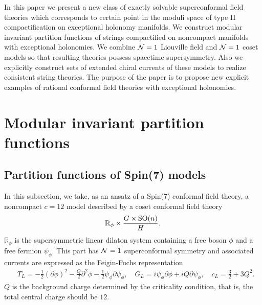 \documentclass[a4paper,12pt]{article}
\numberwithin{equation}{section}
\newcommand{\Rb}{\mathbb{R}}
\newcommand{\Ncal}{{\cal N}}
\newcommand{\del}{\partial}
\newcommand{\Spin}[1]{{\rm Spin}(#1)}
\newcommand{\SO}[1]{{\rm SO}(#1)}
\newcommand{\psil}{\psi_{\phi}}
\begin{document}
In this paper we present a new class of exactly solvable superconformal 
field theories which corresponds to certain point in the moduli space of 
type II compactification on exceptional holonomy manifolds. We construct 
modular invariant partition functions of strings compactified on 
noncompact manifolds with exceptional holonomies. We combine $\Ncal=1$ 
Liouville field and $\Ncal=1$ coset models so that resulting theories 
possess spacetime supersymmetry. Also 
we explicitly construct sets of extended chiral currents of these models 
to realize consistent string theories. The purpose of the paper is to 
propose new explicit examples of rational conformal field theories with 
exceptional holonomies.

\section{Modular invariant partition functions}
\subsection{Partition functions of \Spin7 models}
\label{spin7CFT}
In this subsection, we take, as an ansatz of a \Spin 7 conformal field
theory, a noncompact $c=12$ model described by a coset conformal field
theory
\begin{align}
 \Rb_{\phi}\times \frac{G\times \SO n}{H}.\label{G2internal}
\end{align}
$\Rb_{\phi}$ is the supersymmetric linear dilaton system
containing a free boson $\phi$ and a free fermion $\psil$. 
This part has $\Ncal=1$ superconformal symmetry and associated
 currents are expressed as the  Feigin-Fuchs representation
\begin{align}
 &T_{L}=-\frac12 (\del \phi)^2-\frac{Q}{2}\del^2\phi-\frac12 \psil\del\psil,
 \quad G_{L}=i\psil\del\phi+iQ\del\psil, \quad c_{L}=\frac32 + 3Q^2.
\label{2-2}
\end{align}
$Q$ is the background charge determined by the criticality
condition, that is, the total central charge should be $12$.
\end{document}
